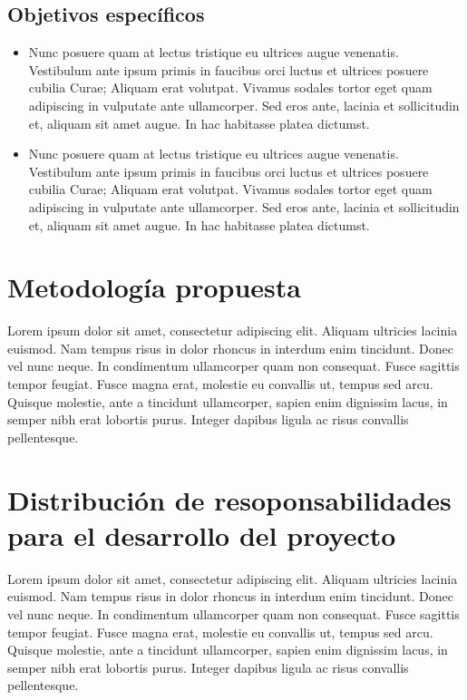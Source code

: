 \subsection{Objetivos específicos}
\begin{itemize}

\item Nunc posuere quam at lectus tristique eu ultrices augue venenatis. Vestibulum ante ipsum primis in faucibus orci luctus et ultrices posuere cubilia Curae; Aliquam erat volutpat. Vivamus sodales tortor eget quam adipiscing in vulputate ante ullamcorper. Sed eros ante, lacinia et sollicitudin et, aliquam sit amet augue. In hac habitasse platea dictumst.

\item Nunc posuere quam at lectus tristique eu ultrices augue venenatis. Vestibulum ante ipsum primis in faucibus orci luctus et ultrices posuere cubilia Curae; Aliquam erat volutpat. Vivamus sodales tortor eget quam adipiscing in vulputate ante ullamcorper. Sed eros ante, lacinia et sollicitudin et, aliquam sit amet augue. In hac habitasse platea dictumst.
\end{itemize}

\section{Metodología propuesta}

Lorem ipsum dolor sit amet, consectetur adipiscing elit. Aliquam ultricies lacinia euismod. Nam tempus risus in dolor rhoncus in interdum enim tincidunt. Donec vel nunc neque. In condimentum ullamcorper quam non consequat. Fusce sagittis tempor feugiat. Fusce magna erat, molestie eu convallis ut, tempus sed arcu. Quisque molestie, ante a tincidunt ullamcorper, sapien enim dignissim lacus, in semper nibh erat lobortis purus. Integer dapibus ligula ac risus convallis pellentesque.

\section{Distribución de resoponsabilidades para el desarrollo del proyecto}

Lorem ipsum dolor sit amet, consectetur adipiscing elit. Aliquam ultricies lacinia euismod. Nam tempus risus in dolor rhoncus in interdum enim tincidunt. Donec vel nunc neque. In condimentum ullamcorper quam non consequat. Fusce sagittis tempor feugiat. Fusce magna erat, molestie eu convallis ut, tempus sed arcu. Quisque molestie, ante a tincidunt ullamcorper, sapien enim dignissim lacus, in semper nibh erat lobortis purus. Integer dapibus ligula ac risus convallis pellentesque.

